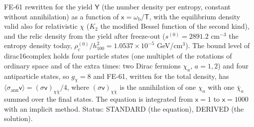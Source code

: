 \documentclass[
  10pt,
]{article}
\begin{document}
FE-61 rewritten for the yield \(\mathsf{Y}\) (the number density per
entropy, constant without annihilation) as a function of
\(\mathsf{x} = \omega_{\mathrm{b}}/\mathsf{T}\), with the equilibrium
density valid also for relativistic \(\chi\) (\(K_2\) the modified
Bessel function of the second kind), and the relic density from the
yield after freeze-out (\(s^{(0)} = 2891.2\) cm\(^{-3}\) the entropy
density today,
\(\rho_{\mathrm{c}}^{(0)}/h_{100}^2 = 1.0537\times10^{-5}\)
GeV/cm\(^3\)). The bound level of dirac16complex holds four particle
states (one multiplet of the rotations of ordinary space and of the
extra times: two Dirac fermions \(\chi_a\), \(a = 1, 2\)) and four
antiparticle states, so \(g_\chi = 8\) and FE-61, written for the total
density, has
\(\langle\sigma_{\mathrm{ann}}\mathsf{v}\rangle = (\sigma\mathsf{v})_{\chi\bar\chi}/4\),
where \((\sigma\mathsf{v})_{\chi\bar\chi}\) is the annihilation of one
\(\chi_a\) with one \(\bar\chi_a\) summed over the final states. The
equation is integrated from \(\mathsf{x} = 1\) to \(\mathsf{x} = 1000\)
with an implicit method. Status: STANDARD (the equation), DERIVED (the
solution).
\end{document}
